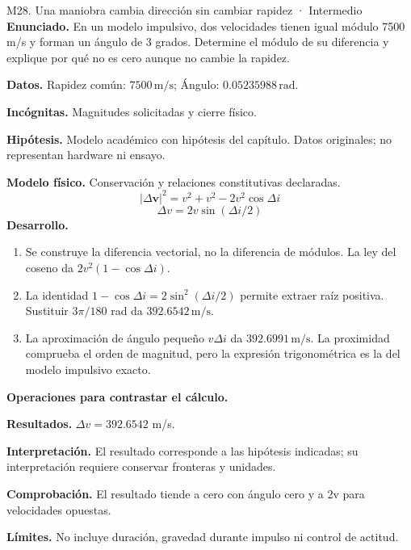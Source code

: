\begin{studiumworked}{M28. Una maniobra cambia dirección sin cambiar rapidez · Intermedio}
\textbf{Enunciado.} En un modelo impulsivo, dos velocidades tienen igual módulo 7500 m/s y forman un ángulo de 3 grados. Determine el módulo de su diferencia y explique por qué no es cero aunque no cambie la rapidez.

\textbf{Datos.} Rapidez común: $7500\,\mathrm{m/s}$; Ángulo: $0.05235988\,\mathrm{rad}$.

\textbf{Incógnitas.} Magnitudes solicitadas y cierre físico.

\textbf{Hipótesis.} Modelo académico con hipótesis del capítulo. Datos originales; no representan hardware ni ensayo.

\textbf{Modelo físico.} Conservación y relaciones constitutivas declaradas.
\[|\Delta\mathbf v|^2=v^2+v^2-2v^2\cos\Delta i\]
\[\Delta v=2v\sin(\Delta i/2)\]
\textbf{Desarrollo.}
\begin{enumerate}
\item Se construye la diferencia vectorial, no la diferencia de módulos. La ley del coseno da $2v^2(1-\cos\Delta i)$.
\item La identidad $1-\cos\Delta i=2\sin^2(\Delta i/2)$ permite extraer raíz positiva. Sustituir $3\pi/180$ rad da $392.6542\,\mathrm{m/s}$.
\item La aproximación de ángulo pequeño $v\Delta i$ da $392.6991\,\mathrm{m/s}$. La proximidad comprueba el orden de magnitud, pero la expresión trigonométrica es la del modelo impulsivo exacto.
\end{enumerate}
\textbf{Operaciones para contrastar el cálculo.}

\textbf{Resultados.} $\Delta v=392.6542$ m/s.

\textbf{Interpretación.} El resultado corresponde a las hipótesis indicadas; su interpretación requiere conservar fronteras y unidades.

\textbf{Comprobación.} El resultado tiende a cero con ángulo cero y a 2v para velocidades opuestas.

\textbf{Límites.} No incluye duración, gravedad durante impulso ni control de actitud.
\end{studiumworked}
